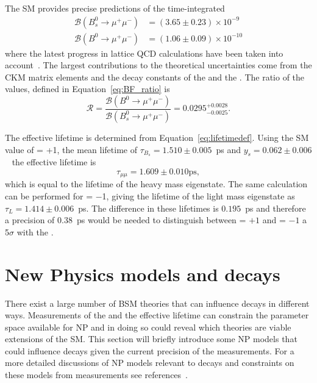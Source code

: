 The SM provides precise predictions of the time-integrated \bmumu \BFs~\cite{Bobeth:2013uxa} %
\begin{align}
\mathcal{B}(B^0_{s} \to \mu^+ \mu^-)& = (3.65 \pm 0.23) \times 10^{-9}\\
\mathcal{B}(B^0 \to\mu^+ \mu^-)& = (1.06 \pm 0.09) \times 10^{-10}
\end{align}
where the latest progress in lattice QCD calculations have been taken into account~\cite{Bazavov:2011aa, Na:2012kp,Witzel:2013sla}. %
The largest contributions to the theoretical uncertainties come from the CKM matrix elements and the decay constants of the \bs and the \bd.
The ratio of the \BF values, defined in Equation~\ref{eq:BF_ratio} is~\cite{CMS:2014xfa} 
\begin{equation}
\mathcal{R} = \frac{\mathcal{B}(B^0 \to\mu^+ \mu^-)}{\mathcal{B}(B^0_{s} \to \mu^+ \mu^-)} = 0.0295^{+0.0028}_{-0.0025}.
\end{equation}


The \bsmumu effective lifetime is determined from Equation~\ref{eq:lifetimedef}. Using the SM value of \ADG = +1, the \bs mean lifetime of $\tau_{B_{s}} = 1.510 \pm 0.005$~ps and $y_{s} = 0.062 \pm 0.006$~\cite{Amhis:2016xyh,Olive:2016xmw} the effective lifetime is
\begin{equation}
\tau_{\mu\mu} = 1.609 \pm 0.010 \mathrm{ps},
\end{equation}
which is equal to the lifetime of the heavy \bs mass eigenstate. The same calculation can be performed for \ADG = $-$1, giving the lifetime of the light mass \bs eigenstate as $\tau_{L} = 1.414 \pm 0.006$~ps.
The difference in these lifetimes is $0.195$~ps and therefore a precision of 0.38~ps would be needed to distinguish between \ADG = $+1$ and \ADG = $-1$ a 5$\sigma$ with the \el. 



\section[New Physics models and \bmumu decays]{New Physics models and \boldmath{\bmumu} decays}
\label{sec:NPmodels}
There exist a large number of BSM theories that can influence \bmumu decays in different ways. Measurements of the \bmumu \BFs and the \bsmumu effective lifetime can constrain the parameter space available for NP and in doing so could reveal which theories are viable extensions of the SM. This section will briefly introduce some NP models that could influence \bmumu decays given the current precision of the \BF measurements. %
For a more detailed discussions of NP models relevant to \bmumu decays and constraints on these models from measurements see references~\cite{Buras:2013uqa,Knegjens:2014zva,Altmannshofer:2014rta}.

